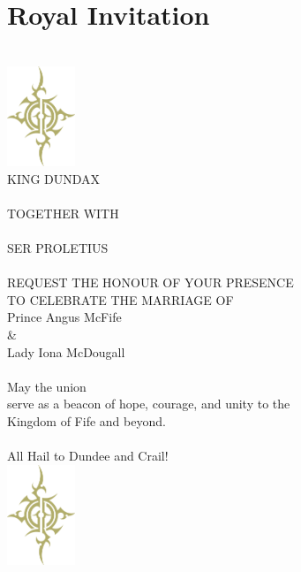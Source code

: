 \onecolumn
\chapter*{Royal Invitation}
%
{\centering%
	\vspace*{1cm}\hfill\\%
	\includegraphics[height=3cm,keepaspectratio]{../images/Gloryhammer_Coat_of_Arms-gold}\\
	{\darkcrystalfont\color{white}%
		{\LARGE KING DUNDAX \\\hfill\\}%
		{\large TOGETHER WITH\\\hfill\\}%
		{\LARGE SER PROLETIUS\\\hfill\\}%
		{\large REQUEST THE HONOUR OF YOUR PRESENCE\\TO CELEBRATE THE MARRIAGE OF}%
	}%
	\vspace*{0.6cm}\hfill\\%
	{\fontsize{40}{40}\selectfont\newspaperFancyHeaderFont\color{titlegold} Prince Angus McFife\\\&\\Lady Iona McDougall\\}%
	\vspace*{0.8cm}\hfill\\%
	{\large\darkcrystalfont\color{white}May the union\\serve as a beacon of hope, courage, and unity to the\\Kingdom of Fife and beyond.}\\%
	\vspace*{0.75cm}\hfill\\%
	{\Large\darkcrystalfont\color{white}All Hail to Dundee and Crail!}\\%
	\includegraphics[height=3cm,keepaspectratio]{../images/Gloryhammer_Coat_of_Arms-gold}\\%
}%